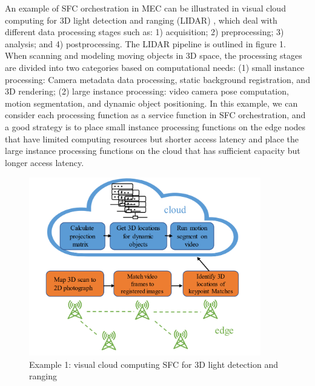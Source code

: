  An example of SFC orchestration in MEC can be illustrated in visual cloud computing for 3D light detection and ranging (LIDAR) \cite{visualcomputing}, which deal with different data processing stages such as: 1) acquisition; 2) preprocessing; 3) analysis; and 4) postprocessing. The LIDAR pipeline is outlined in figure 1. When scanning and modeling moving objects in 3D space, the processing stages are divided into two categories based on computational needs: (1) small instance processing: Camera metadata data processing, static background registration, and 3D rendering; (2) large instance processing: video camera pose computation, motion segmentation, and dynamic object positioning. In this example, we can consider each processing function as a service function in SFC orchestration, and a good strategy is to place small instance processing functions on the edge nodes that have limited computing resources but shorter access latency and place the large instance processing functions on the cloud that has sufficient capacity but longer access latency.
\begin{figure}
	\centering
	\includegraphics[width=0.9\textwidth]{figs/LIDAR.PNG}
		\vspace{\baselineskip}
	\caption{Example 1: visual cloud computing SFC for 3D light detection and ranging \cite{visualcomputing}}
	\label{fig:lidar}
\end{figure}

